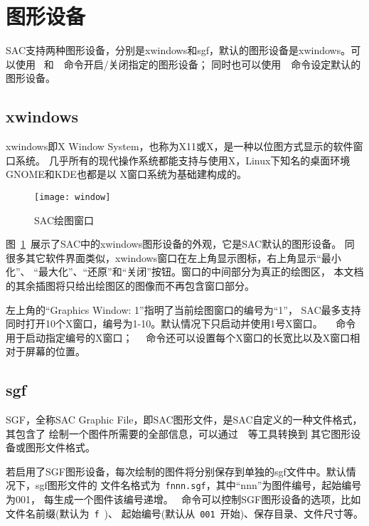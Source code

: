 \section{图形设备}
SAC支持两种图形设备，分别是xwindows和sgf，默认的图形设备是xwindows。可以使用
~和~~命令开启/关闭指定的图形设备；
同时也可以使用~~命令设定默认的图形设备。

\subsection{xwindows}
xwindows即X Window System，也称为X11或X，是一种以位图方式显示的软件窗口系统。
几乎所有的现代操作系统都能支持与使用X，Linux下知名的桌面环境GNOME和KDE也都是以
X窗口系统为基础建构成的。

\begin{figure}[H]
\centering
\texttt{[image: window]}
\caption{SAC绘图窗口}
\label{fig:plot}
\end{figure}

图~\ref{fig:plot}~展示了SAC中的xwindows图形设备的外观，它是SAC默认的图形设备。
同很多其它软件界面类似，xwindows窗口在左上角显示图标，右上角显示``最小化''、
``最大化''、``还原''和``关闭''按钮。窗口的中间部分为真正的绘图区，
本文档的其余插图将只给出绘图区的图像而不再包含窗口部分。

左上角的``Graphics Window: 1''指明了当前绘图窗口的编号为``1''，
SAC最多支持同时打开10个X窗口，编号为1-10。默认情况下只启动并使用1号X窗口。
~~命令用于启动指定编号的X窗口；
~~命令还可以设置每个X窗口的长宽比以及X窗口相对于屏幕的位置。

\subsection{sgf}
SGF，全称SAC Graphic File，即SAC图形文件，是SAC自定义的一种文件格式，其包含了
绘制一个图件所需要的全部信息，可以通过~~等工具转换到
其它图形设备或图形文件格式。

若启用了SGF图形设备，每次绘制的图件将分别保存到单独的sgf文件中。默认情况下，sgf图形文件的
文件名格式为~\verb+fnnn.sgf+，其中``nnn''为图件编号，起始编号为001，
每生成一个图件该编号递增。
~命令可以控制SGF图形设备的选项，比如文件名前缀(默认为~\verb+f+~)、
起始编号(默认从~\verb+001+~开始)、保存目录、文件尺寸等。
